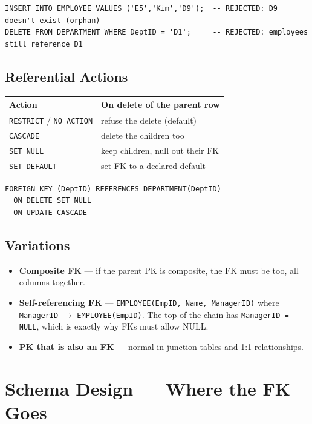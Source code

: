 \documentclass[12pt]{article}
\begin{document}
\begin{lstlisting}[style=sqlstyle]
INSERT INTO EMPLOYEE VALUES ('E5','Kim','D9');  -- REJECTED: D9 doesn't exist (orphan)
DELETE FROM DEPARTMENT WHERE DeptID = 'D1';     -- REJECTED: employees still reference D1
\end{lstlisting}

\subsection*{Referential Actions}

\begin{table}[H]
\centering
\begin{tabular}{|l|l|}
\hline
\textbf{Action} & \textbf{On delete of the parent row} \\
\hline
\texttt{RESTRICT} / \texttt{NO ACTION} & refuse the delete (default) \\
\texttt{CASCADE} & delete the children too \\
\texttt{SET NULL} & keep children, null out their FK \\
\texttt{SET DEFAULT} & set FK to a declared default \\
\hline
\end{tabular}
\end{table}

\begin{lstlisting}[style=sqlstyle]
FOREIGN KEY (DeptID) REFERENCES DEPARTMENT(DeptID)
  ON DELETE SET NULL
  ON UPDATE CASCADE
\end{lstlisting}

\subsection*{Variations}

\begin{itemize}
    \item \textbf{Composite FK} --- if the parent PK is composite, the FK must be too, all columns together.
    \item \textbf{Self-referencing FK} --- \texttt{EMPLOYEE(EmpID, Name, ManagerID)}
    where \texttt{ManagerID} $\to$ \texttt{EMPLOYEE(EmpID)}. The top of the chain
    has \texttt{ManagerID = NULL}, which is exactly why FKs must allow NULL.
    \item \textbf{PK that is also an FK} --- normal in junction tables and 1:1 relationships.
\end{itemize}

\section{Schema Design --- Where the FK Goes}
\end{document}
